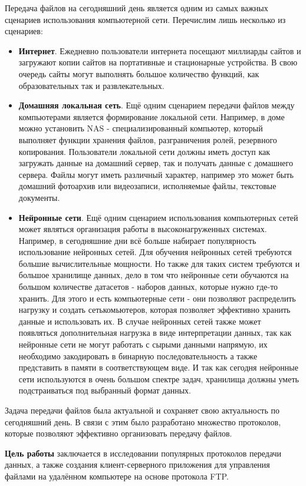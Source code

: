 \documentclass[a4paper,14pt]{extarticle}
\begin{document}
Передача файлов на сегодняшний день является одним из самых важных 
сценариев использования компьютерной сети. Перечислим лишь несколько из сценариев:
\begin{itemize}
\item \textbf{Интернет}. Ежедневно пользователи
интернета посещают миллиарды сайтов и загружают копии 
сайтов на портативные и стационарные устройства. В свою очередь 
сайты могут выполнять большое количество функций, как образовательных
так и развлекательных. 
\item \textbf{Домашняя локальная сеть}. Ещё одним сценарием передачи файлов между 
компьютерами является формирование локальной сети. Например, 
в доме можно установить NAS - специализированный компьютер, который 
выполняет функции хранения файлов, разграничения ролей, резервного копирования. 
Пользователи локальной сети должны иметь доступ как загружать данные 
на домашний сервер, так и получать данные с домашнего сервера. Файлы могут иметь различный характер, 
например это может быть домашний фотоархив или видеозаписи, исполняемые файлы, 
текстовые документы. 
\item \textbf{Нейронные сети}. Ещё одним сценарием использования компьютерных 
сетей может являться организация работы в высоконагруженных системах. 
Например, в сегодняшние дни всё больше набирает популярность использование нейронных
сетей. Для обучения нейронных сетей требуются большие вычислительные
мощности. Но также для таких систем требуются и большое хранилище данных, 
дело в том что нейронные сети обучаются на большом количестве датасетов - наборов данных, 
которые нужно где-то хранить. Для этого и есть компьютерные сети - они позволяют
распределить нагрузку и создать сетькомьютеров, 
которая позволяет эффективно хранить данные и использовать их. В случае нейронных сетей
также может появляться дополнительная нагрузка в виде интерпретации данных, так как
нейронные сети не могут работать с сырыми данными напрямую, их необходимо закодировать
в бинарную последовательность а также представить в памяти в соответствующем виде. 
И так как сегодня нейронные сети используются в очень большом спектре задач, 
хранилища должны уметь подстраиваться под выбранный формат данных.
\end{itemize}

Задача передачи файлов была актуальной и сохраняет свою актуальность
по сегодняшний день. В связи с этим было разработано множество протоколов, 
которые позволяют эффективно организовать передачу файлов.

\textbf{Цель работы} заключается в исследовании популярных протоколов передачи данных, 
а также создания клиент-серверного приложения для управления файлами на удалённом 
компьютере на основе протокола FTP.
\end{document}

